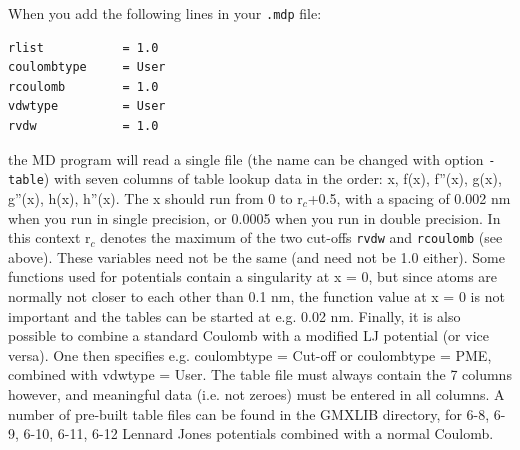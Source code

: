 When you add the following lines in your {\tt .mdp} file:
\begin{verbatim}
rlist           = 1.0
coulombtype     = User
rcoulomb        = 1.0
vdwtype         = User
rvdw            = 1.0
\end{verbatim}
the MD program will read a single file (the name can be changed with
option {\tt -table}) with seven columns of table lookup data in the
order: x, f(x), f''(x), g(x), g''(x), h(x), h''(x).  The x should run
from 0 to r$_c$+0.5, with a spacing of 0.002 nm when you run in single
precision, or 0.0005 when you run in double precision.  In this
context r$_c$ denotes the maximum of the two cut-offs {\tt rvdw} and
{\tt rcoulomb} (see above). These variables need not be the same (and
need not be 1.0 either).  Some functions used for potentials contain a
singularity at x = 0, but since atoms are normally not closer to each
other than 0.1 nm, the function value at x = 0 is not important and
the tables can be started at e.g. 0.02 nm.  Finally, it is also
possible to combine a standard Coulomb with a modified LJ potential
(or vice versa). One then specifies e.g. coulombtype = Cut-off or
coulombtype = PME, combined with vdwtype = User.  The table file must
always contain the 7 columns however, and meaningful data (i.e. not
zeroes) must be entered in all columns.  A number of pre-built table
files can be found in the GMXLIB directory, for 6-8, 6-9, 6-10, 6-11, 6-12
Lennard Jones potentials combined with a normal Coulomb.


